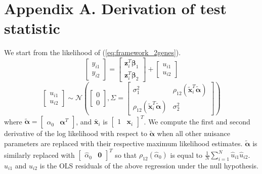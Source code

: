 \documentclass[aap,authoryear, preprint]{imsart}
\numberwithin{equation}{section}
\theoremstyle{plain}
\begin{document}


 
\pagebreak
 
\section*{Appendix A. Derivation of test statistic}
We start from the likelihood of (\ref{eq:framework_2genes}).  
\begin{equation*}
    \begin{bmatrix} y_{i1} \\ y_{i2} \end{bmatrix} = 
    \begin{bmatrix} \bm{z}_i^T\bm{\beta}_1 \\ \bm{z}_i^T \bm{\beta}_2 \end{bmatrix} + \begin{bmatrix} u_{i1} \\ u_{i2} \end{bmatrix}
\end{equation*}
\begin{equation*}
    \begin{bmatrix} u_{i1} \\ u_{i2} \end{bmatrix} \sim \mathcal{N} \left( 
    \begin{bmatrix} 0 \\0 \end{bmatrix}, \Sigma = \begin{bmatrix} \sigma_1^2 & \rho_{12}(\bm{\tilde{x}}_i^T\bm{\tilde{\alpha}}) \\ \rho_{12}(\bm{\tilde{x}}_i^T\bm{\tilde{\alpha}}) & \sigma_2^2 \end{bmatrix}\right)
\end{equation*}
where $\tilde{\bm{\alpha}} = \begin{bmatrix} \alpha_0& \bm{\alpha}^T \end{bmatrix}$, and $\tilde{\bm{x}_i}$ is $\begin{bmatrix} 1 & \bm{x}_i\end{bmatrix}^T$. 
We compute the first and second derivative of the log likelihood with respect to $\bm{\tilde{\alpha}}$ when all other nuisance parameters are replaced with their respective maximum likelihood estimates. $\bm{\tilde{\alpha}}$ is similarly replaced with $\begin{bmatrix} \hat{\alpha}_0 & \bm{0}\end{bmatrix}^T$ so that $\rho_{12}(\hat{\alpha}_0)$ is equal to $\frac{1}{N} \sum_{i=1}^{N} \hat{u}_{i1}\hat{u}_{i2}$. $\hat{u}_{i1}$ and $\hat{u}_{i2}$ is the OLS residuals of the above regression under the null hypothesis.
\end{document}

